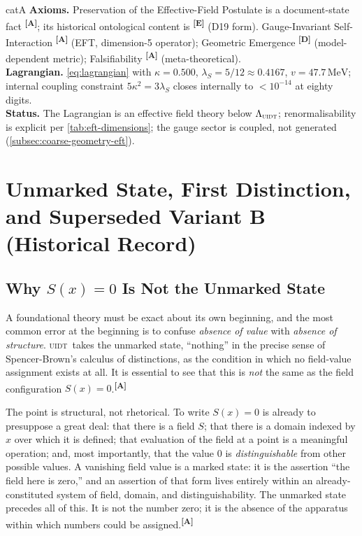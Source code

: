 \documentclass[12pt,a4paper,twoside]{article}
\theoremstyle{plain}
\theoremstyle{definition}
\theoremstyle{remark}
\newcommand{\UIDT}{\textsc{uidt}}
\newcommand{\MeV}{\,\mathrm{MeV}}
\newcommand{\catmark}[1]{\textsuperscript{\textsf{\textbf{[#1]}}}}
\newcommand{\lambdaS}{5/12 \approx 0.4167} %
\newcommand{\kappaVal}{0.500} %
\newcommand{\vVEV}{47.7\MeV} %
\begin{document}
\begin{evidencebox}{catA}
\textbf{Axioms.} Preservation of the Effective-Field Postulate is a
document-state fact \catmark{A}; its historical ontological content is
\catmark{E} (D19 form). Gauge-Invariant Self-Interaction \catmark{A} (EFT, dimension-5
operator); Geometric Emergence \catmark{D} (model-dependent metric);
Falsifiability \catmark{A} (meta-theoretical).\\[0.3em]
\textbf{Lagrangian.} \cref{eq:lagrangian} with $\kappa=\kappaVal$,
$\lambda_S=\lambdaS$, $v=\vVEV$; internal coupling constraint
$5\kappa^2=3\lambda_S$ closes internally to $<10^{-14}$ at eighty
digits.\\[0.3em]
\textbf{Status.} The Lagrangian is an effective field theory below
$\Lambda_{\UIDT}$; renormalisability is explicit per
\cref{tab:eft-dimensions}; the gauge sector is coupled, not generated
(\cref{subsec:coarse-geometry-eft}).
\end{evidencebox}

\section{Unmarked State, First Distinction, and Superseded Variant B (Historical Record)}
\label{sec:unmarked-distinction-sx}

\subsection{Why \texorpdfstring{$S(x)=0$}{S(x)=0} Is Not the Unmarked State}
\label{subsec:sx-zero-not-unmarked}

A foundational theory must be exact about its own beginning, and the
most common error at the beginning is to confuse \emph{absence of value}
with \emph{absence of structure}. \UIDT\ takes the unmarked state,
``nothing'' in the precise sense of Spencer-Brown's calculus of
distinctions, as the condition in which no field-value assignment exists
at all. It is essential to see that this is \emph{not} the same as the
field configuration $S(x) = 0$.\catmark{A}

The point is structural, not rhetorical. To write $S(x) = 0$ is already
to presuppose a great deal: that there is a field $S$; that there is a
domain indexed by $x$ over which it is defined; that evaluation of the
field at a point is a meaningful operation; and, most importantly, that
the value $0$ is \emph{distinguishable} from other possible values. A
vanishing field value is a marked state: it is the assertion ``the field
here is zero,'' and an assertion of that form lives entirely within an
already-constituted system of field, domain, and distinguishability. The
unmarked state precedes all of this. It is not the number zero; it is
the absence of the apparatus within which numbers could be
assigned.\catmark{A}
\end{document}
